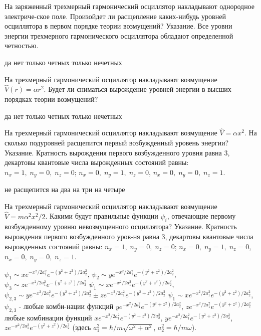 \documentclass[11pt,a4paper]{exam}
\begin{document}
\begin{questions}
\question На заряженный трехмерный гармонический осциллятор накладывают однородное электриче-ское поле. Произойдет ли расщепление каких-нибудь уровней осциллятора в первом порядке теории возмущений? Указание. Все уровни энергии трехмерного гармонического осциллятора обладают определенной четностью.
\begin{choices}
\choice да    
\choice нет      
\choice только четных     
\choice только нечетных
\end{choices}

\question На трехмерный гармонический осциллятор накладывают возмущение $\hat V(r) = \alpha {r^2}$. Будет ли сниматься вырождение уровней энергии в высших порядках теории возмущений?
\begin{choices}
\choice да    
\choice нет      
\choice только четных     
\choice только нечетных
\end{choices}

\question На трехмерный гармонический осциллятор накладывают возмущение $\hat V = \alpha {x^2}$. На сколько подуровней расщепится первый возбужденный уровень энергии? Указание. Кратность вырождения первого возбужденного уровня равна 3, декартовы квантовые числа вырожденных состояний равны: ${n_x} = 1,\;{n_y} = 0,\;{n_z} = 0$; ${n_x} = 0,\;{n_y} = 1,\;{n_z} = 0$, ${n_x} = 0,\;{n_y} = 0,\;{n_z} = 1$.
\begin{choices}
\choice не расщепится  
\choice на два   
\choice на три   
\choice на четыре
\end{choices}

\question На трехмерный гармонический осциллятор накладывают возмущение $\hat V = m{\alpha ^2}{x^2}/2$. Какими будут правильные функции ${\psi _i}$, отвечающие первому возбужденному уровню невозмущенного осциллятора? Указание. Кратность вырождения первого возбужденного уров-ня равна 3, декартовы квантовые числа вырожденных состояний равны: ${n_x} = 1,\;{n_y} = 0,\;{n_z} = 0$; ${n_x} = 0,\;{n_y} = 1,\;{n_z} = 0$, ${n_x} = 0,\;{n_y} = 0,\;{n_z} = 1$.
\begin{choices}
\choice ${\psi _1} \sim x{e^{ - {x^2}/2a_1^2}}{e^{ - ({y^2} + {z^2})/2a_2^2}}$,  ${\psi _2} \sim y{e^{ - {x^2}/2a_1^2}}{e^{ - ({y^2} + {z^2})/2a_2^2}}$, ${\psi _3} \sim z{e^{ - {x^2}/2a_1^2}}{e^{ - ({y^2} + {z^2})/2a_2^2}}$
\choice ${\psi _1} \sim x{e^{ - {x^2}/2a_1^2}}{e^{ - ({y^2} + {z^2})/2a_2^2}}$,  ${\psi _{2,3}} \sim y{e^{ - {x^2}/2a_1^2}}{e^{ - ({y^2} + {z^2})/2a_2^2}} \pm z{e^{ - {x^2}/2a_1^2}}{e^{ - ({y^2} + {z^2})/2a_2^2}}$
\choice ${\psi _1} \sim x{e^{ - {x^2}/2a_1^2}}{e^{ - ({y^2} + {z^2})/2a_2^2}}$, ${\psi _{2,3}}$ - любые комби-нации функций $y{e^{ - {x^2}/2a_1^2}}{e^{ - ({y^2} + {z^2})/2a_2^2}}$, $z{e^{ - {x^2}/2a_1^2}}{e^{ - ({y^2} + {z^2})/2a_2^2}}$
\choice любые комбинации функций $x{e^{ - {x^2}/2a_1^2}}{e^{ - ({y^2} + {z^2})/2a_2^2}}$, $y{e^{ - {x^2}/2a_1^2}}{e^{ - ({y^2} + {z^2})/2a_2^2}}$, $z{e^{ - {x^2}/2a_1^2}}{e^{ - ({y^2} + {z^2})/2a_2^2}}$
(здесь $a_1^2 = \hbar /m\sqrt {{\omega ^2} + {\alpha ^2}} $, $a_2^2 = \hbar /m\omega $).
\end{choices}


\end{questions}
\end{document}
